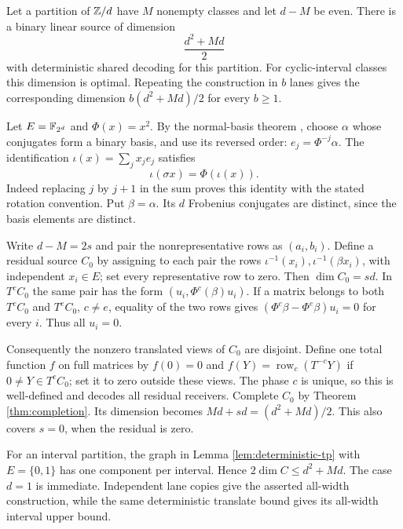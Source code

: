 \begin{theorem}\label{thm:interval-attainment}
Let a partition of $\mathbb{Z}/d$ have $M$ nonempty classes and let $d-M$ be even.
There is a binary linear source of dimension
\[
 \frac{d^2+Md}{2}
\]
with deterministic shared decoding for this partition. For cyclic-interval
classes this dimension is optimal. Repeating the construction in $b$ lanes
gives the corresponding dimension $b(d^2+Md)/2$ for every $b\ge1$.
\end{theorem}
\begin{outline}
Let $E=\mathbb{F}_{2^d}$ and $\Phi(x)=x^2$. By the normal-basis theorem
\cite[Theorem~5.18]{Milne2022}, choose
$\alpha$ whose conjugates form a binary basis, and use its reversed order:
$e_j=\Phi^{-j}\alpha$. The identification
$\iota(x)=\sum_jx_je_j$ satisfies
\[
 \iota(\sigma x)=\Phi(\iota(x)).
\]
Indeed replacing $j$ by $j+1$ in the sum proves this identity with the
stated rotation convention. Put $\beta=\alpha$. Its $d$ Frobenius
conjugates are distinct, since the basis elements are distinct.

Write $d-M=2s$ and pair the nonrepresentative rows as $(a_i,b_i)$.
Define a residual source $C_0$ by assigning to each pair the rows
$\iota^{-1}(x_i),\iota^{-1}(\beta x_i)$, with independent $x_i\in E$;
set every representative row to zero. Then $\dim C_0=sd$. In $T^cC_0$
the same pair has the form $(u_i,\Phi^c(\beta)u_i)$. If a matrix belongs
to both $T^cC_0$ and $T^eC_0$, $c\ne e$, equality of the two rows gives
$(\Phi^c\beta-\Phi^e\beta)u_i=0$ for every $i$. Thus all $u_i=0$.

Consequently the nonzero translated views of $C_0$ are disjoint. Define
one total function $f$ on full matrices by $f(0)=0$ and
$f(Y)=\operatorname{row}_c(T^{-c}Y)$ if $0\ne Y\in T^cC_0$; set it to
zero outside these views. The phase $c$ is unique, so this is well-defined
and decodes all residual receivers. Complete $C_0$ by Theorem
\ref{thm:completion}. Its dimension becomes $Md+sd=(d^2+Md)/2$.
This also covers $s=0$, when the residual is zero.

For an interval partition, the graph in Lemma \ref{lem:deterministic-tp}
with $E=\{0,1\}$ has one component per interval. Hence
$2\dim C\le d^2+Md$. The case $d=1$ is immediate. Independent lane
copies give the asserted all-width construction, while the same
deterministic translate bound gives its all-width interval upper bound.
\end{outline}

